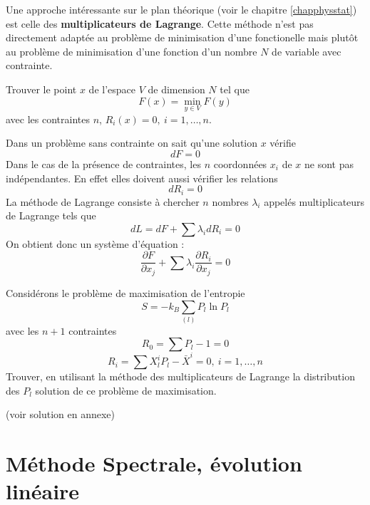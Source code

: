 \documentclass[12pt]{book}
\begin{document}
Une approche int\'eressante sur le plan th\'eorique (voir le chapitre
\ref{chapphysstat})  est celle des {\bf multiplicateurs de Lagrange}.
Cette m\'ethode n'est pas directement adapt\'ee au probl\`eme de
minimisation d'une fonctionelle mais plut\^ot au probl\`eme de
minimisation d'une fonction d'un nombre $N$ de variable avec
contrainte.
\begin{prob}
Trouver le point $x$ de l'espace $V$ de dimension $N$ tel que 
\begin{equation} 
F(x)=\min_{y\in V}F(y)
\end{equation}
avec les contraintes $n$, $R_i(x)=0,\ i=1,\dots,n.$
\end{prob}
Dans un probl\`eme sans contrainte on sait qu'une solution $x$
v\'erifie 
\begin{equation}
dF=0
\end{equation}
Dans le cas de la pr\'esence de contraintes, les $n$ coordonn\'ees
$x_i$ de $x$ ne sont pas ind\'ependantes. En effet elles doivent aussi
v\'erifier les relations
\begin{equation}
dR_i=0
\end{equation}
La m\'ethode de Lagrange consiste \`a chercher $n$ nombres $\lambda_i$
appel\'es multiplicateurs de Lagrange tels que 
\begin{equation}
dL=dF+\sum \lambda_i dR_i=0
\end{equation}
On obtient donc un syst\`eme d'\'equation :
\begin{equation}
\frac{\partial F}{\partial x_j}+\sum \lambda_i \frac{\partial R_i}{\partial x_j}=0
\end{equation}
\begin{exo}\label{exoentr}
Consid\'erons le probl\`eme de maximisation de l'entropie 
\begin{equation}
S=-k_B\sum_{(l)}P_l\ln P_l
\end{equation}
avec les $n+1$ contraintes 
\begin{equation}
R_0=\sum P_l-1=0
\end{equation}
\begin{equation}
R_i=\sum X^i_lP_l-\bar X^i=0,\ i=1,\dots,n
\end{equation}
Trouver, en utilisant la m\'ethode des multiplicateurs de Lagrange la
distribution des $P_l$ solution de ce probl\`eme de maximisation.
\end{exo}
(voir solution en annexe)


\section{M\'ethode Spectrale, \'evolution lin\'eaire}\label{chapmethspec}
\end{document}
